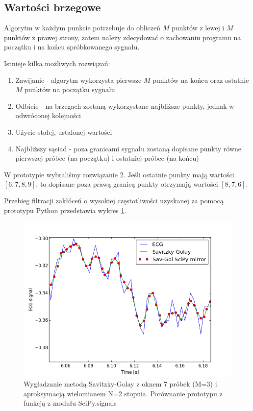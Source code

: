 \subsection{Wartości brzegowe}
Algorytm w każdym punkcie potrzebuje do obliczeń $M$ punktów z lewej i $M$ punktów z prawej strony, zatem należy zdecydować o zachowaniu programu na początku i na końcu spróbkowanego sygnału.

Istnieje kilka możliwych rozwiązań:
\begin{enumerate}
\item Zawijanie - algorytm wykorzysta pierwsze $M$ punktów na końcu oraz ostatnie $M$ punktów na początku sygnału
\item Odbicie - na brzegach zostaną wykorzystane najbliższe punkty, jednak w odwróconej kolejności
\item Użycie stałej, ustalonej wartości
\item Najbliższy sąsiad - poza granicami sygnału zostaną dopisane punkty równe pierwszej próbce (na początku) i ostatniej próbce (na końcu)
\end{enumerate}

W prototypie wybraliśmy rozwiązanie 2. Jeśli ostatnie punkty mają wartości $[6, 7, 8, 9]$, to dopisane poza prawą granicą punkty otrzymają wartości $[8, 7, 6]$.


Przebieg filtracji zakłóceń o wysokiej częstotliwości uzyskanej za pomocą prototypu Python przedstawia wykres \ref{rys:savitzky_py}.

\begin{figure}[!htb]
  \begin{center}
    \includegraphics[scale=0.8]
    {img/prototype.png}
  \end{center}
  \caption{Wygładzanie metodą Savitzky-Golay z oknem 7 próbek (M=3) i aproksymacją wielomianem N=2 stopnia. Porównanie prototypu z funkcją z modułu SciPy.signals}
  \label{rys:savitzky_py}
\end{figure}

